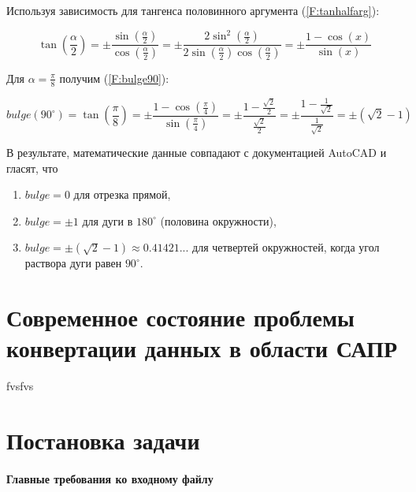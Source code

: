 Используя зависимость для тангенса половинного аргумента (\ref{F:tanhalfarg}):

\begin{equation}
	\tan(\frac{\alpha}{2})=\pm\frac{\sin(\frac{\alpha}{2})}{\cos(\frac{\alpha}{2})}=\pm\frac{2\sin^2(\frac{\alpha}{2})}{2\sin(\frac{\alpha}{2})\cos(\frac{\alpha}{2})}=\pm\frac{1-\cos(x)}{\sin(x)}
	\label{F:tanhalfarg}
\end{equation}

Для $\alpha=\frac{\pi}{8}$ получим (\ref{F:bulge90}):

\begin{equation}
	bulge(90^{\circ})=\tan(\frac{\pi}{8})=\pm\frac{1-\cos(\frac{\pi}{4})}{\sin(\frac{\pi}{4})}=\pm\frac{1-\frac{\sqrt2}{2}}{\frac{\sqrt2}{2}}=\pm\frac{1-\frac{1}{\sqrt2}}{\frac{1}{\sqrt2}}=\pm(\sqrt2-1)
	\label{F:bulge90}
\end{equation}



В результате, математические данные совпадают с документацией AutoCAD \cite{Autodesk} и гласят, что

\begin{enumerate}
	\item $bulge = 0$ для отрезка прямой,
	\item $bulge = \pm1$ для дуги в $180^{\circ}$ (половина окружности),
	\item $bulge = \pm(\sqrt2-1) \approx0.41421...$ для четвертей окружностей, когда угол раствора дуги равен $90^{\circ}$.
\end{enumerate}

\section{Современное состояние проблемы конвертации данных в области САПР}
fvsfvs

\section{Постановка задачи}

\paragraph{Главные требования ко входному файлу}

